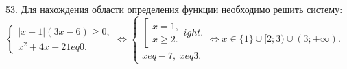 53. Для нахождения области определения функции необходимо решить систему:\\ $\begin{cases} |x-1|(3x-6)\geqslant0,\\ x^2+4x-21
eq0.\end{cases}\Leftrightarrow
\begin{cases} \left[\begin{array}{l} x=1,\\ x\geqslant2.\end{array}
ight.\\ x
eq-7,\ x
eq3.\end{cases}\Leftrightarrow x\in \{1\}\cup[2;3)\cup(3;+\infty).$\\
